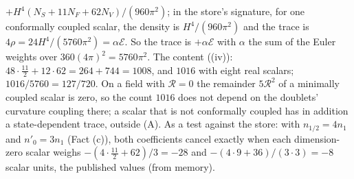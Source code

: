 $+H^{4}(N_{S} + 11N_{F} + 62N_{V})/(960\pi^{2})$; in the store's signature, for one conformally coupled scalar, the density is $H^{4}/(960\pi^{2})$ and the trace is $4\rho = 24H^{4}/(5760\pi^{2}) = \alpha\mathcal{E}$. So the trace is $+\alpha\mathcal{E}$ with $\alpha$ the sum of the Euler weights over $360(4\pi)^{2} = 5760\pi^{2}$. The content ((iv)): $48 \cdot \tfrac{11}{2} + 12 \cdot 62 = 264 + 744 = 1008$, and $1016$ with eight real scalars; $1016/5760 = 127/720$. On a field with $\mathcal{R} = 0$ the remainder $5\mathcal{R}^{2}$ of a minimally coupled scalar is zero, so the count $1016$ does not depend on the doublets' curvature coupling there; a scalar that is not conformally coupled has in addition a state-dependent trace, outside (A). As a test against the store: with $n_{1/2} = 4n_{1}$ and $n'_{0} = 3n_{1}$ (Fact (c)), both coefficients cancel exactly when each dimension-zero scalar weighs $-(4 \cdot \tfrac{11}{2} + 62)/3 = -28$ and $-(4 \cdot 9 + 36)/(3 \cdot 3) = -8$ scalar units, the published values (from memory).

